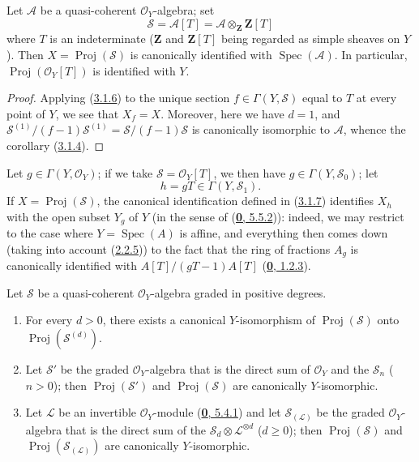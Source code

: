 \begin{corollary}[3.1.7]
\label{II.3.1.7}
Let $\mathcal{A}$ be a quasi-coherent $\mathcal{O}_Y$-algebra; set
\[
  \mathcal{S}=\mathcal{A}[T]
  =\mathcal{A}\otimes_{\mathbf{Z}}\mathbf{Z}[T]
\]
where $T$ is an indeterminate ($\mathbf{Z}$ and $\mathbf{Z}[T]$ being
regarded as simple sheaves on $Y$). Then
$X=\operatorname{Proj}(\mathcal{S})$ is canonically identified with
$\operatorname{Spec}(\mathcal{A})$. In particular,
$\operatorname{Proj}(\mathcal{O}_Y[T])$ is identified with $Y$.
\end{corollary}

\begin{proof}
Applying (\hyperref[II.3.1.6]{3.1.6}) to the unique section
$f\in\Gamma(Y,\mathcal{S})$ equal to $T$ at every point of $Y$, we see that
$X_f=X$. Moreover, here we have $d=1$, and
$\mathcal{S}^{(1)}/(f-1)\mathcal{S}^{(1)}
=\mathcal{S}/(f-1)\mathcal{S}$ is canonically isomorphic to $\mathcal{A}$,
whence the corollary (\hyperref[II.3.1.4]{3.1.4}).
\end{proof}

Let $g\in\Gamma(Y,\mathcal{O}_Y)$; if we take
$\mathcal{S}=\mathcal{O}_Y[T]$, we then have $g\in\Gamma(Y,\mathcal{S}_0)$; let
\[
  h=gT\in\Gamma(Y,\mathcal{S}_1).
\]
If $X=\operatorname{Proj}(\mathcal{S})$, the canonical identification defined
in (\hyperref[II.3.1.7]{3.1.7}) identifies $X_h$ with the open subset
$Y_g$ of $Y$ (in the sense of (\hyperref[0.5.5.2]{\textbf{0}, 5.5.2})): indeed, we
may restrict to the case where $Y=\operatorname{Spec}(A)$ is affine, and
everything then comes down (taking into account
(\hyperref[II.2.2.5]{2.2.5})) to the fact that the ring of fractions $A_g$
is canonically identified with $A[T]/(gT-1)A[T]$
(\hyperref[0.1.2.3]{\textbf{0}, 1.2.3}).

\begin{proposition}[3.1.8]
\label{II.3.1.8}
Let $\mathcal{S}$ be a quasi-coherent $\mathcal{O}_Y$-algebra graded in
positive degrees.
\begin{enumerate}
  \item[\rm(i)] For every $d>0$, there exists a canonical $Y$-isomorphism of
    $\operatorname{Proj}(\mathcal{S})$ onto
    $\operatorname{Proj}(\mathcal{S}^{(d)})$.


  \item[\rm(ii)] Let $\mathcal{S}'$ be the graded $\mathcal{O}_Y$-algebra that
    is the direct sum of $\mathcal{O}_Y$ and the $\mathcal{S}_n$ ($n>0$);
    then $\operatorname{Proj}(\mathcal{S}')$ and
    $\operatorname{Proj}(\mathcal{S})$ are canonically $Y$-isomorphic.
  \item[\rm(iii)] Let $\mathcal{L}$ be an invertible $\mathcal{O}_Y$-module
    \textup{(\hyperref[0.5.4.1]{\textbf{0}, 5.4.1})} and let $\mathcal{S}_{(\mathcal{L})}$
    be the graded $\mathcal{O}_Y$-algebra that is the direct sum of the
    $\mathcal{S}_d\otimes\mathcal{L}^{\otimes d}$ ($d\geq0$); then
    $\operatorname{Proj}(\mathcal{S})$ and
    $\operatorname{Proj}(\mathcal{S}_{(\mathcal{L})})$ are canonically
    $Y$-isomorphic.
\end{enumerate}
\end{proposition}

